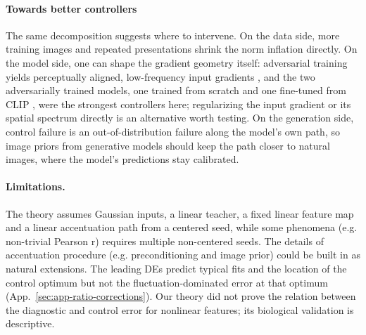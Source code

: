 \paragraph{Towards better controllers} The same decomposition suggests where to intervene. On the data side, more training images and repeated presentations shrink the norm inflation directly. On the model side, one can shape the gradient geometry itself: adversarial training yields perceptually aligned, low-frequency input gradients \citep{madry2018towardsResistant,santurkar2019imageSynthesisRobust}, and the two adversarially trained models, one trained from scratch and one fine-tuned from CLIP \citep{ganz2024clipag}, were the strongest controllers here; regularizing the input gradient or its spatial spectrum directly \citep{ross2018inputGradientRegularization} is an alternative worth testing. On the generation side, control failure is an out-of-distribution failure along the model's own path, so image priors from generative models \citep{bashivan2019neuralPopulationControl,pierzchlewicz2023energyGuidedDiffusion,wang2026neuronalTuningManifolds} should keep the path closer to natural images, where the model's predictions stay calibrated. 

\paragraph{Limitations.}
The theory assumes Gaussian inputs, a linear teacher, a fixed linear feature map and a linear accentuation path from a centered seed, while some phenomena (e.g. non-trivial Pearson r) requires multiple non-centered seeds.
The details of accentuation procedure (e.g. preconditioning and image prior) could be built in as natural extensions.
The leading DEs predict typical fits and the location of the control optimum but not the fluctuation-dominated error at that optimum (App.~\ref{sec:app-ratio-corrections}).
Our theory did not prove the relation between the diagnostic and control error for nonlinear features; its biological validation is descriptive. %
